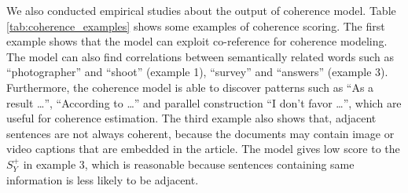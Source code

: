 \documentclass[letterpaper]{article} %
\begin{document}
	We also conducted empirical studies about the output of coherence model. Table \ref{tab:coherence_examples} shows some examples of coherence scoring. The first example shows that the model can exploit co-reference for coherence modeling. The model can also find correlations between semantically related words such as ``photographer'' and ``shoot'' (example 1), ``survey'' and ``answers'' (example 3). Furthermore, the coherence model is able to discover patterns such as ``As a result \dots'', ``According to \dots'' and parallel construction ``I don't favor \dots'', which are useful for coherence estimation. The third example also shows that, adjacent sentences are not always coherent, because the documents may contain image or video captions that are embedded in the article. The model gives low score to the $S_Y^+$ in example 3, which is reasonable because sentences containing same information is less likely to be adjacent.
	
\end{document}
